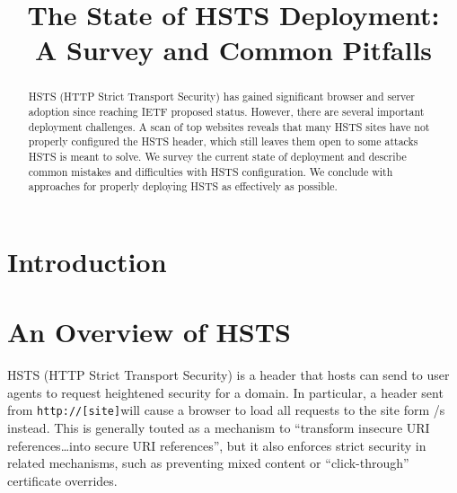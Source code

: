 \documentclass[conference]{./IEEEtran}
\newcommand{\site}[1]{\texttt{#1}}
\newcommand{\genericsite}{[site]}
\newcommand{\h}{{\site{http://\genericsite}}}
\theoremstyle{plain}
\begin{document}
\title{The State of HSTS Deployment:\\A Survey and Common Pitfalls}

\author{}


\maketitle

\thispagestyle{fancy}

\begin{abstract}
HSTS (HTTP Strict Transport Security) has gained significant browser and server adoption since reaching IETF proposed status. However, there are several important deployment challenges. A scan of top websites reveals that many HSTS sites have not properly configured the HSTS header, which still leaves them open to some attacks HSTS is meant to solve. We survey the current state of deployment and describe common mistakes and difficulties with HSTS configuration. We conclude with approaches for properly deploying HSTS as effectively as possible.
\end{abstract}

\section{Introduction}
\label{sec:intro}

\section{An Overview of HSTS}

HSTS (HTTP Strict Transport Security) is a header that hosts can send to user agents to request heightened security for a domain. In particular, a header sent from \h will cause a browser to load all requests to the site form /s instead. This is generally touted as a mechanism to ``transform insecure URI references\ldots into secure URI references'', but it also enforces strict security in related mechanisms, such as preventing mixed content or ``click-through'' certificate overrides\cite{rfc}.
\end{document}

